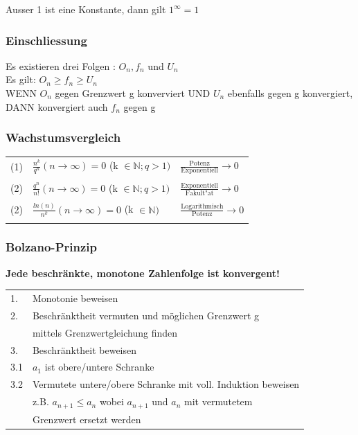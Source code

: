 			Ausser 1 ist eine Konstante, dann gilt $1^{\infty} = 1 $ \\
			
			
			\subsubsection{Einschliessung}  %
			Es existieren drei Folgen : $O_n, f_n$ und $U_n$\\
			Es gilt: $O_n \geq f_n \geq U_n$ \\
			
			WENN $O_n$ gegen Grenzwert g konverviert UND $U_n$ ebenfalls gegen g konvergiert, DANN konvergiert auch  $f_n$ gegen g \\ 
		
			
			\subsubsection{Wachstumsvergleich} 
			\begin{tabular}{lll}
			(1) & $\frac{n^k}{q^n} (n \rightarrow \infty)= 0$  (k $\in \mathbb{N}; q > 1)$ & $\frac{\text{Potenz}}{\text{Exponentiell}} \rightarrow 0$\\
			\\
			(2) & $\frac{q^n}{n!} (n \rightarrow \infty)= 0$  (k $\in \mathbb{N}; q > 1)$ & $\frac{\text{Exponentiell}}{\text{Fakult"at}} \rightarrow 0$ \\
			\\
			(2) & $\frac{ln(n)}{n^k} (n \rightarrow \infty)= 0$  (k $\in \mathbb{N})$ & $\frac{\text{Logarithmisch}}{\text{Potenz}} \rightarrow 0$ \\
			\\
			\end{tabular}						
			
			
			\subsubsection{Bolzano-Prinzip}
			\textbf{Jede beschränkte, monotone Zahlenfolge ist konvergent!} \\
			\begin{tabular}{ll}
			1. & Monotonie beweisen \\
			2. &  Beschränktheit vermuten und möglichen Grenzwert g \\ 
			& mittels Grenzwertgleichung finden  \\
			3. & Beschränktheit beweisen \\
			3.1 & $a_1$ ist obere/untere Schranke \\
			3.2 & Vermutete untere/obere Schranke mit voll. Induktion beweisen \\
			& z.B. $a_{n+1} \leq a_n$ wobei $a_{n+1}$ und $a_n$ mit vermutetem \\
			& Grenzwert ersetzt werden
			\end{tabular}
			

